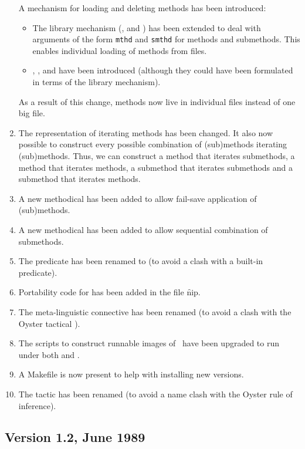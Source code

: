\begin{enumerate}
A mechanism for loading and deleting methods has been introduced:
   \begin{itemize}
        \item
        The library mechanism (, 
        and ) has been extended to deal
        with arguments of the form {\tt mthd} and {\tt smthd} for
        methods and submethods. This enables individual loading of
        methods from files.
        \item\raggedright
        , ,
         and  have been
        introduced (although they could have been formulated in terms
        of the library mechanism).
   \end{itemize}
As a result of this change, methods now live in individual files
instead of one big file. 
\item
The representation of iterating methods has been changed. It also now
possible to construct every possible combination of (sub)methods
iterating (sub)methods. Thus, we can construct a method that iterates
submethods, a method that iterates methods, a submethod that iterates
submethods and a submethod that iterates methods.
\item
A new  methodical has been added to allow fail-save
application of (sub)methods.
\item
A new  methodical has been added to allow sequential
combination of submethods.
\item
The predicate  has been renamed to  (to avoid
a clash with a built-in  predicate).
\item
Portability code for  has been added in the file \f{nip}.
\item
The meta-linguistic connective  has been renamed  (to
avoid a clash with the Oyster tactical ).
\item
The scripts to construct runnable images of \clam\ have been upgraded
to run under both  and .
\item
A Makefile is now present to help with installing new versions.
\item
The tactic  has been renamed  (to avoid a
name clash with the Oyster rule of inference).
\end{enumerate}

\subsection {Version 1.2, June 1989}

